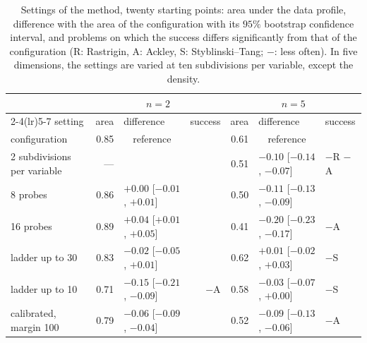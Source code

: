 \documentclass[pdflatex,sn-basic]{sn-jnl}
\begin{document}
\begin{table}[t]
  \centering
  \caption{Settings of the method, twenty starting points: area under the data
    profile, difference with the area of the configuration with its $95\%$
    bootstrap confidence interval, and problems on which the success differs
    significantly from that of the configuration (R: Rastrigin, A: Ackley, S:
    Styblinski--Tang; $-$: less often). In five dimensions, the settings are
    varied at ten subdivisions per variable, except the density.}
  \label{tab:variants}
  \scriptsize
  \setlength{\tabcolsep}{2.5pt}
  \begin{tabular}{lrlrrll}
    \toprule
    & \multicolumn{3}{c}{$n = 2$} & \multicolumn{3}{c}{$n = 5$} \\
    \cmidrule(lr){2-4}\cmidrule(lr){5-7}
    setting & area & difference & success & area & difference & success \\
    \midrule
    configuration                  & 0.85 & \multicolumn{1}{c}{reference} & & 0.61 & \multicolumn{1}{c}{reference} & \\
    2 subdivisions per variable    & --- & & & 0.51 & $-0.10$ [$-0.14$, $-0.07$] & $-$R $-$A \\
    8 probes                       & 0.86 & $+0.00$ [$-0.01$, $+0.01$] &  & 0.50 & $-0.11$ [$-0.13$, $-0.09$] & \\
    16 probes                      & 0.89 & $+0.04$ [$+0.01$, $+0.05$] &  & 0.41 & $-0.20$ [$-0.23$, $-0.17$] & $-$A \\
    ladder up to 30                & 0.83 & $-0.02$ [$-0.05$, $+0.01$] &  & 0.62 & $+0.01$ [$-0.02$, $+0.03$] & $-$S \\
    ladder up to 10                & 0.71 & $-0.15$ [$-0.21$, $-0.09$] & $-$A & 0.58 & $-0.03$ [$-0.07$, $+0.00$] & $-$S \\
    calibrated, margin 100         & 0.79 & $-0.06$ [$-0.09$, $-0.04$] &  & 0.52 & $-0.09$ [$-0.13$, $-0.06$] & $-$A \\
    \bottomrule
  \end{tabular}
\end{table}
\end{document}
